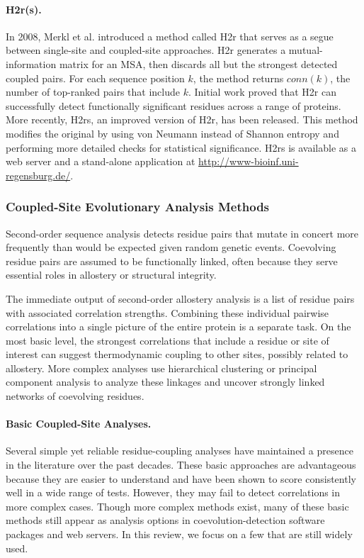 \paragraph{H2r(s).} In 2008, Merkl et al. introduced a method called H2r that serves as a segue between single-site and coupled-site approaches.\cite{Merkl2008a} H2r generates a mutual-information matrix for an MSA, then discards all but the strongest detected coupled pairs. For each sequence position $k$, the method returns $conn(k)$, the number of top-ranked pairs that include $k$. Initial work proved that H2r can successfully detect functionally significant residues across a range of proteins. More recently, H2rs, an improved version of H2r, has been released.\cite{Janda2014a} This method modifies the original by using von Neumann instead of Shannon entropy and performing more detailed checks for statistical significance. H2rs is available as a web server and a stand-alone application at \url{http://www-bioinf.uni-regensburg.de/}.
\subsubsection{Coupled-Site Evolutionary Analysis Methods}
\par Second-order sequence analysis detects residue pairs that mutate in concert more frequently than would be expected given random genetic events. Coevolving residue pairs are assumed to be functionally linked, often because they serve essential roles in allostery or structural integrity.
\par The immediate output of second-order allostery analysis is a list of residue pairs with associated correlation strengths. Combining these individual pairwise correlations into a single picture of the entire protein is a separate task. On the most basic level, the strongest correlations that include a residue or site of interest can suggest thermodynamic coupling to other sites, possibly related to allostery. More complex analyses use hierarchical clustering or principal component analysis to analyze these linkages and uncover strongly linked networks of coevolving residues.
\paragraph{Basic Coupled-Site Analyses.} Several simple yet reliable residue-coupling analyses have maintained a presence in the literature over the past decades. These basic approaches are advantageous because they are easier to understand and have been shown to score consistently well in a wide range of tests. However, they may fail to detect correlations in more complex cases.\cite{Pele2014a, Brown2010a} Though more complex methods exist, many of these basic methods still appear as analysis options in coevolution-detection software packages and web servers. In this review, we focus on a few that are still widely used.
